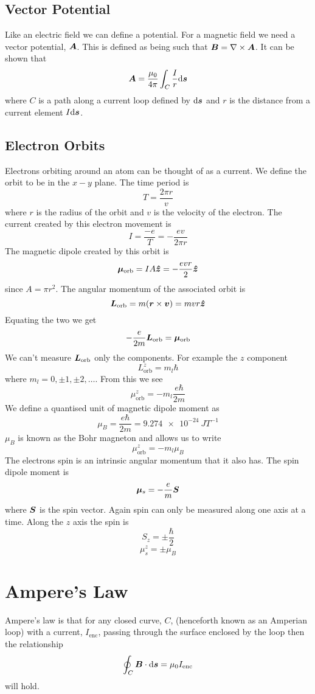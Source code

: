 \documentclass{article}
\begin{document}
    \subsection{Vector Potential}
    Like an electric field we can define a potential.
    For a magnetic field we need a vector potential, \(\bm{A}\).
    This is defined as being such that \(\bm{B} = \nabla\times\bm{A}\).
    It can be shown that
    \[\bm{A} = \frac{\mu_0}{4\pi}\int_C \frac{I}{r}\dd\bm{s}\]
    where \(C\) is a path along a current loop defined by \(\dd\bm{s}\) and \(r\) is the distance from a current element \(I\dd\bm{s}\).
    
    \subsection{Electron Orbits}
    Electrons orbiting around an atom can be thought of as a current.
    We define the orbit to be in the \(x{-}y\) plane.
    The time period is
    \[T = \frac{2\pi r}{v}\]
    where \(r\) is the radius of the orbit and \(v\) is the velocity of the electron.
    The current created by this electron movement is
    \[I = \frac{-e}{T} = -\frac{ev}{2\pi r}\]
    The magnetic dipole created by this orbit is
    \[\bm{\mu}_\text{orb} = IA\bm{\hat{z}} = -\frac{evr}{2}\bm{\hat{z}}\]
    since \(A = \pi r^2\).
    The angular momentum of the associated orbit is
    \[\bm{L}_\text{orb} = m(\bm{r} \times \bm{v}) = mvr\bm{\hat{z}}\]
    Equating the two we get
    \[-\frac{e}{2m}\bm{L}_\text{orb} = \bm{\mu}_\text{orb}\]
    We can't measure \(\bm{L}_\text{orb}\) only the components.
    For example the \(z\) component
    \[L_\text{orb}^z = m_l\hbar\]
    where \(m_l = 0,\pm 1,\pm 2,\dotsc\).
    From this we see
    \[\mu_\text{orb}^z = -m_l\frac{e\hbar}{2m}\]
    We define a quantised unit of magnetic dipole moment as
    \[\mu_B = \frac{e\hbar}{2m} = \SI{9.274e-24}{JT^{-1}}\]
    \(\mu_B\) is known as the Bohr magneton and allows us to write
    \[\mu_\text{orb}^z = -m_l\mu_B\]
    The electrons spin is an intrinsic angular momentum that it also has.
    The spin dipole moment is
    \[\bm{\mu}_s = -\frac{e}{m}\bm{S}\]
    where \(\bm{S}\) is the spin vector.
    Again spin can only be measured along one axis at a time.
    Along the \(z\) axis the spin is
    \[S_z = \pm\frac{\hbar}{2}\]
    \[\mu_s^z = \pm\mu_B\]
    
    \section{Ampere's Law}
    Ampere's law is that for any closed curve, \(C\), (henceforth known as an Amperian loop) with a current, \(I_\text{enc}\), passing through the surface enclosed by the loop then the relationship
    \[\oint_C\bm{B}\cdot\dd\bm{s} = \mu_0I_\text{enc}\]
    will hold.
    
\end{document}
